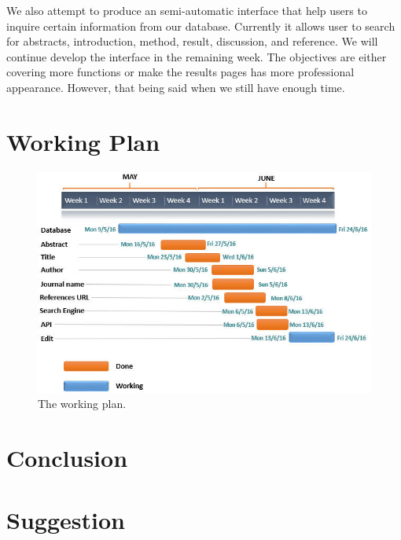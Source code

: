 	We also attempt to produce an semi-automatic interface that help users to inquire certain information from our database. 
	Currently it allows user to search for abstracts, introduction, method, result, discussion, and reference. 
	We will continue develop the interface in the remaining week. 
	The objectives are either covering more functions or make the results pages has more professional appearance. 
	However, that being said when we still have enough time.
	
\section*{Working Plan}

\begin{figure}[tbh]
	\begin{center}
		\includegraphics[width=\columnwidth]{Union_Result_Chart_working plan}
	\end{center}
	\caption{The working plan.}
	\end{figure}
	
\section*{Conclusion}

\section*{Suggestion}